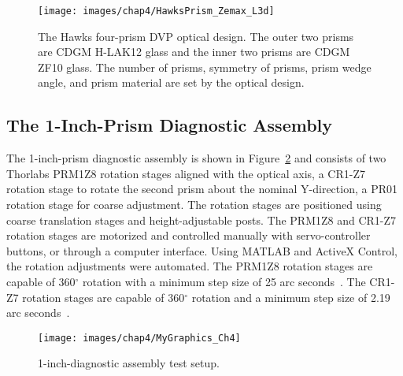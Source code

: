 \begin{figure}[H]  %
\centering
\texttt{[image: images/chap4/HawksPrism\_Zemax\_L3d]}
\caption{The Hawks four-prism DVP optical design. The outer two prisms are CDGM H-LAK12 glass and the inner two prisms are CDGM ZF10 glass. The number of prisms, symmetry of prisms, prism wedge angle, and prism material are set by the optical design.}
\label{fig:HawksPrism_Zemax_L3d}
\end{figure}

\subsection{The 1-Inch-Prism Diagnostic Assembly}
The 1-inch-prism diagnostic assembly is shown in Figure~\ref{fig:1_inch_diagnostic} and consists of two Thorlabs PRM1Z8 rotation stages aligned with the optical axis, a CR1-Z7 rotation stage to rotate the second prism about the nominal Y-direction, a PR01 rotation stage for coarse adjustment. The rotation stages are positioned using coarse translation stages and height-adjustable posts. The PRM1Z8 and CR1-Z7 rotation stages are motorized and controlled manually with servo-controller buttons, or through a computer interface. Using MATLAB and ActiveX Control, the rotation adjustments were automated. The PRM1Z8 rotation stages are capable of 360$^\circ$ rotation with a minimum step size of 25 arc seconds~\cite{PRM1Z8}. The CR1-Z7 rotation stages are capable of 360$^\circ$ rotation and a minimum step size of 2.19 arc seconds~\cite{CR1Z7}.


\begin{figure}[H]  %
\centering
\texttt{[image: images/chap4/MyGraphics\_Ch4]}
\caption{1-inch-diagnostic assembly test setup.}
\label{fig:1_inch_diagnostic}
\end{figure}

